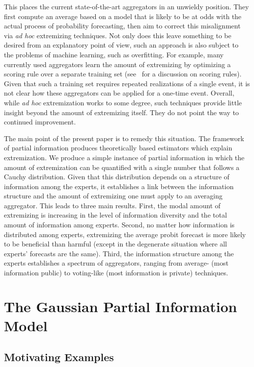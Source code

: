 \documentclass[11pt]{article}
\theoremstyle{definition}
\theoremstyle{definition}
\begin{document}
This places the current state-of-the-art aggregators in an unwieldy
position.  They first compute an average based on a model that
is likely to be at odds with the actual process of probability
forecasting, then aim to correct this misalignment via {\em ad hoc} 
extremizing techniques.  
%
Not only does this leave something to be desired from an explanatory 
point of view, such an approach is also subject to the problems of 
machine learning, such as overfitting.  For example, many currently
used aggregators learn the amount of extremizing by optimizing a scoring
rule over a separate training set (see~\citealt{Gneiting04strictlyproper} 
for a discussion on scoring rules).
Given that such a training set requires repeated realizations of
a single event, it is not clear how these aggregators can be applied
for a one-time event. Overall, while {\em ad hoc} extremization works to some degree, such
techniques provide little insight beyond the amount of extremizing
itself.  They do not point the way to continued improvement.

The main point of the present paper is to remedy this situation.
The framework of partial information produces theoretically
based estimators which explain extremization.  We produce a 
simple instance of partial information in which the amount of 
extremization can be quantified with a single number
that follows a Cauchy distribution.  Given that this distribution
depends on a structure of information among the experts, it establishes
a link between the information structure and the amount of
extremizing one must apply to an averaging aggregator.  This leads
to three main results.  First, the modal amount of extremizing is 
increasing in the level of information diversity and the total amount 
of information among experts.  Second, no matter how information is 
distributed among experts, extremizing the average probit forecast
is more likely to be beneficial than harmful (except in the degenerate
situation where all experts' forecasts are the same). Third, the information structure among the experts establishes a spectrum of aggregators, ranging from average- (most information public) to voting-like (most information is private) techniques. 


\section{The Gaussian Partial Information Model}
\label{sec:model}

\subsection{Motivating Examples}
\end{document}
